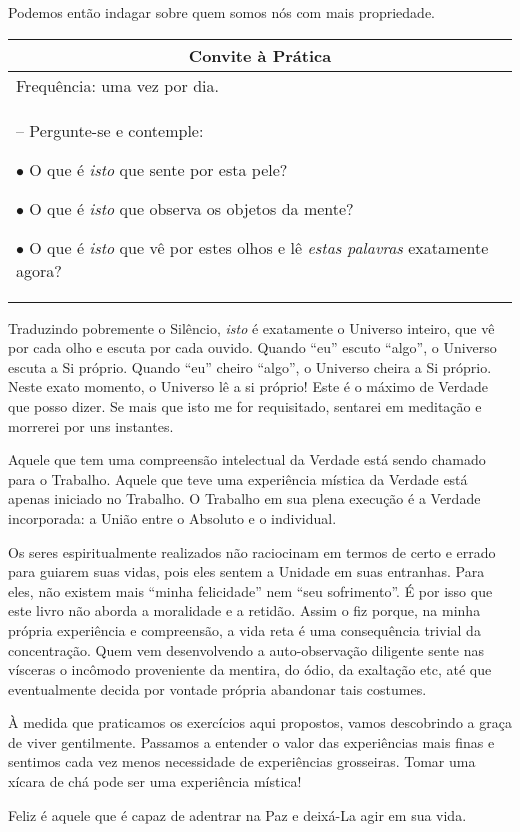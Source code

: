 \documentclass[oneside, 12pt]{book}
\newenvironment{prat}[1]
{\begin{center}
\begin{tabular}{p{0.9\textwidth}}
\hline\hline
\multicolumn{1}{c}{Convite à Prática}\\
\hline
Frequência: #1.\\
\hline
}{\\
\hline\hline
\end{tabular} 
\end{center}}
\begin{document}
Podemos então indagar sobre quem somos nós com mais propriedade.

\begin{prat}{uma vez por dia}

-- Pergunte-se e contemple:

$\bullet$ O que é \textit{isto} que sente por esta pele?

$\bullet$ O que é \textit{isto} que observa os objetos da mente?

$\bullet$ O que é \textit{isto} que vê por estes olhos e lê \textit{estas palavras} exatamente agora?
\end{prat}

Traduzindo pobremente o Silêncio, \textit{isto} é exatamente o Universo inteiro, que vê por cada olho e escuta por cada ouvido. Quando ``eu'' escuto ``algo'', o Universo escuta a Si próprio. Quando ``eu'' cheiro ``algo'', o Universo cheira a Si próprio. Neste exato momento, o Universo lê a si próprio! Este é o máximo de Verdade que posso dizer. Se mais que isto me for requisitado, sentarei em meditação e morrerei por uns instantes.

Aquele que tem uma compreensão intelectual da Verdade está sendo chamado para o Trabalho. Aquele que teve uma experiência mística da Verdade está apenas iniciado no Trabalho. O Trabalho em sua plena execução é a Verdade incorporada: a União entre o Absoluto e o individual.

Os seres espiritualmente realizados não raciocinam em termos de certo e errado para guiarem suas vidas, pois eles sentem a Unidade em suas entranhas. Para eles, não existem mais ``minha felicidade'' nem ``seu sofrimento''. É por isso que este livro não aborda a moralidade e a retidão. Assim o fiz porque, na minha própria experiência e compreensão, a vida reta é uma consequência trivial da concentração. Quem vem desenvolvendo a auto-observação diligente sente nas vísceras o incômodo proveniente da mentira, do ódio, da exaltação etc, até que eventualmente decida por vontade própria abandonar tais costumes.

À medida que praticamos os exercícios aqui propostos, vamos descobrindo a graça de viver gentilmente. Passamos a entender o valor das experiências mais finas e sentimos cada vez menos necessidade de experiências grosseiras. Tomar uma xícara de chá pode ser uma experiência mística!

Feliz é aquele que é capaz de adentrar na Paz e deixá-La agir em sua vida.
\end{document}
